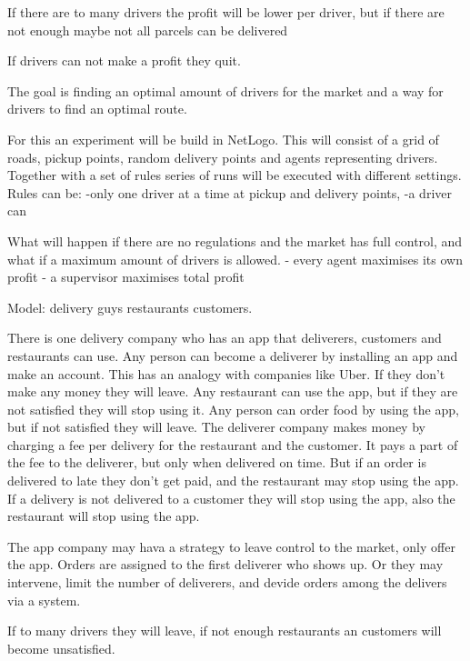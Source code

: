 If there are to many drivers the profit will be lower per driver, but if there are not enough maybe not all parcels can be delivered

If drivers can not make a profit they quit.

The goal is finding an optimal amount of drivers for the market and a way for drivers to find an optimal route.

For this an experiment will be build in NetLogo.
This will consist of a grid of roads, pickup points, random delivery points and agents representing drivers.
Together with a set of rules series of runs will be executed with different settings.
Rules can be:
-only one driver at a time at pickup and delivery points,
-a driver can

What will happen if there are no regulations and the market has full control, and what if a maximum amount of drivers is allowed.
- every agent maximises its own profit
- a supervisor maximises total profit

Model:
delivery guys
restaurants
customers.

There is one delivery company who has an app that deliverers, customers and restaurants can use.
Any person can become a deliverer by installing an app and make an account.
This has an analogy with companies like Uber.
If they don't make any money they will leave.
Any restaurant can use the app, but if they are not satisfied they will stop using it.
Any person can order food by using the app, but if not satisfied they will leave.
The deliverer company makes money by charging a fee per delivery for the restaurant and the customer.
It pays a part of the fee to the deliverer, but only when delivered on time.
But if an order is delivered to late they don't get paid, and the restaurant may stop using the app.
If a delivery is not delivered to a customer they will stop using the app, also the restaurant will stop using the app.

The app company may hava a strategy to leave control to the market, only offer the app.
Orders are assigned to the first deliverer who shows up.
Or they may intervene, limit the number of deliverers, and devide orders among the delivers via a system.







If to many drivers they will leave, if not enough restaurants an customers will become unsatisfied.



